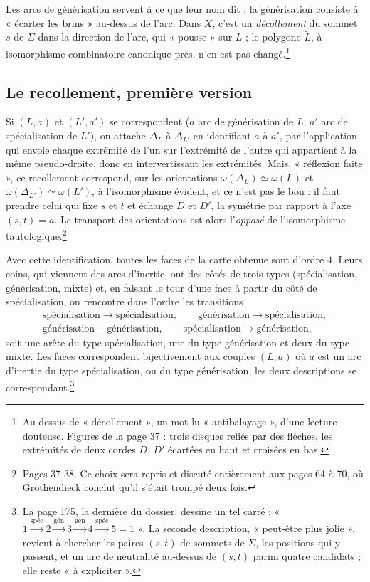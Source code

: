 \documentclass[11pt,a4paper]{article}
\begin{document}
Les arcs de générisation servent à ce que leur nom dit : la générisation
consiste à « écarter les brins » au-dessus de l'arc. Dans $X$, c'est un
\emph{décollement} du sommet $s$ de $\Sigma$ dans la direction de l'arc, qui
« pousse » sur $L$ ; le polygone $\widetilde{L}$, à isomorphisme combinatoire
canonique près, n'en est pas changé.\footnote{Au-dessus de « décollement », un
mot lu « antibalayage », d'une lecture douteuse. Figures de la page 37 : trois
disques reliés par des flèches, les extrémités de deux cordes $D$, $D'$ écartées
en haut et croisées en bas.}

\subsection*{Le recollement, première version}

Si $(L, a)$ et $(L', a')$ se correspondent ($a$ arc de générisation de $L$,
$a'$ arc de spécialisation de $L'$), on attache $\Delta_L$ à $\Delta_{L'}$ en
identifiant $a$ à $a'$, par l'application qui envoie chaque extrémité de l'un
sur l'extrémité de l'autre qui appartient à la même pseudo-droite, donc en
intervertissant les extrémités. Mais, « réflexion faite », ce recollement
correspond, sur les orientations $\omega(\Delta_L) \simeq \omega(L)$ et
$\omega(\Delta_{L'}) \simeq \omega(L')$, à l'isomorphisme évident, et ce n'est
pas le bon : il faut prendre celui qui fixe $s$ et $t$ et échange $D$ et $D'$,
la symétrie par rapport à l'axe $(s, t) = a$. Le transport des orientations est
alors l'\emph{opposé} de l'isomorphisme tautologique.\footnote{Pages 37-38. Ce
choix sera repris et discuté entièrement aux pages 64 à 70, où Grothendieck
conclut qu'il s'était trompé deux fois.}

Avec cette identification, toutes les faces de la carte obtenue sont d'ordre
$4$. Leurs coins, qui viennent des arcs d'inertie, ont des côtés de trois types
(spécialisation, générisation, mixte) et, en faisant le tour d'une face à
partir du côté de spécialisation, on rencontre dans l'ordre les transitions
\begin{gather*}
\text{spécialisation} \to \text{spécialisation}, \qquad \text{générisation} \to
\text{spécialisation}, \\
\text{générisation} - \text{générisation}, \qquad
\text{spécialisation} \to \text{générisation},
\end{gather*}
soit une arête du type spécialisation, une du type générisation et deux du type
mixte. Les faces correspondent bijectivement aux couples $(L, a)$ où $a$ est un
arc d'inertie du type spécialisation, ou du type générisation, les deux
descriptions se correspondant.\footnote{La page 175, la dernière du dossier,
dessine un tel carré : « $1 \xrightarrow{\text{spéc}} 2
\xrightarrow{\text{gén}} 3 \xrightarrow{\text{gén}} 4 \xrightarrow{\text{spéc}} 5
= 1$ ». La seconde description, « peut-être plus jolie », revient à chercher les
paires $(s, t)$ de sommets de $\Sigma$, les positions qui y passent, et un arc
de neutralité au-dessus de $(s, t)$ parmi quatre candidats ; elle reste « à
expliciter ».}
\end{document}
